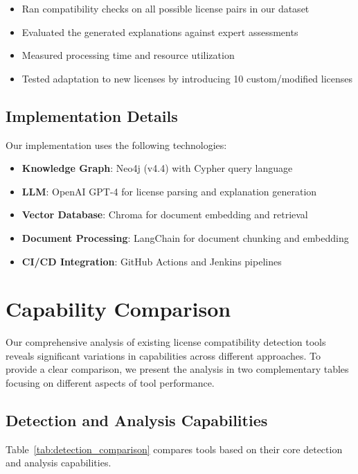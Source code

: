 \documentclass[9pt,twocolumn]{article}
\begin{document}
\begin{itemize}
    \item Ran compatibility checks on all possible license pairs in our dataset
    \item Evaluated the generated explanations against expert assessments
    \item Measured processing time and resource utilization
    \item Tested adaptation to new licenses by introducing 10 custom/modified licenses
\end{itemize}

\subsection{Implementation Details}
Our implementation uses the following technologies:

\begin{itemize}
    \item \textbf{Knowledge Graph}: Neo4j (v4.4) with Cypher query language
    \item \textbf{LLM}: OpenAI GPT-4 for license parsing and explanation generation
    \item \textbf{Vector Database}: Chroma for document embedding and retrieval
    \item \textbf{Document Processing}: LangChain for document chunking and embedding
    \item \textbf{CI/CD Integration}: GitHub Actions and Jenkins pipelines
\end{itemize}

\section{Capability Comparison}
\label{sec:capability_comparison}

Our comprehensive analysis of existing license compatibility detection tools reveals significant variations in capabilities across different approaches. To provide a clear comparison, we present the analysis in two complementary tables focusing on different aspects of tool performance.

\subsection{Detection and Analysis Capabilities}
Table~\ref{tab:detection_comparison} compares tools based on their core detection and analysis capabilities.
\end{document}
